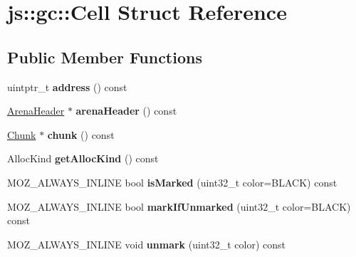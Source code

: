 \hypertarget{structjs_1_1gc_1_1_cell}{\section{js\-:\-:gc\-:\-:Cell Struct Reference}
\label{structjs_1_1gc_1_1_cell}
}
\subsection*{Public Member Functions}
\begin{DoxyCompactItemize}
\item 
\hypertarget{structjs_1_1gc_1_1_cell_ae8c0e74e2cec647b280ebef5bb3fd9ec}{uintptr\-\_\-t {\bfseries address} () const }\label{structjs_1_1gc_1_1_cell_ae8c0e74e2cec647b280ebef5bb3fd9ec}

\item 
\hypertarget{structjs_1_1gc_1_1_cell_a68366ddd7ed558a819d956b45f0ca95e}{\hyperlink{structjs_1_1gc_1_1_arena_header}{Arena\-Header} $\ast$ {\bfseries arena\-Header} () const }\label{structjs_1_1gc_1_1_cell_a68366ddd7ed558a819d956b45f0ca95e}

\item 
\hypertarget{structjs_1_1gc_1_1_cell_ad20ef58f2306cd2be7421b1f43a764ec}{\hyperlink{structjs_1_1gc_1_1_chunk}{Chunk} $\ast$ {\bfseries chunk} () const }\label{structjs_1_1gc_1_1_cell_ad20ef58f2306cd2be7421b1f43a764ec}

\item 
\hypertarget{structjs_1_1gc_1_1_cell_a6cb5ec84ff5f9620ee3d362c00fe1cd5}{Alloc\-Kind {\bfseries get\-Alloc\-Kind} () const }\label{structjs_1_1gc_1_1_cell_a6cb5ec84ff5f9620ee3d362c00fe1cd5}

\item 
\hypertarget{structjs_1_1gc_1_1_cell_a3c8e595b9ea4eae81cd23246a9bd1f81}{M\-O\-Z\-\_\-\-A\-L\-W\-A\-Y\-S\-\_\-\-I\-N\-L\-I\-N\-E bool {\bfseries is\-Marked} (uint32\-\_\-t color=B\-L\-A\-C\-K) const }\label{structjs_1_1gc_1_1_cell_a3c8e595b9ea4eae81cd23246a9bd1f81}

\item 
\hypertarget{structjs_1_1gc_1_1_cell_a158293fe3d64b4bdd67483b033d21964}{M\-O\-Z\-\_\-\-A\-L\-W\-A\-Y\-S\-\_\-\-I\-N\-L\-I\-N\-E bool {\bfseries mark\-If\-Unmarked} (uint32\-\_\-t color=B\-L\-A\-C\-K) const }\label{structjs_1_1gc_1_1_cell_a158293fe3d64b4bdd67483b033d21964}

\item 
\hypertarget{structjs_1_1gc_1_1_cell_ab77ce768a7d1ac169a6a32cbc6a22845}{M\-O\-Z\-\_\-\-A\-L\-W\-A\-Y\-S\-\_\-\-I\-N\-L\-I\-N\-E void {\bfseries unmark} (uint32\-\_\-t color) const }\label{structjs_1_1gc_1_1_cell_ab77ce768a7d1ac169a6a32cbc6a22845}


\end{DoxyCompactItemize}
